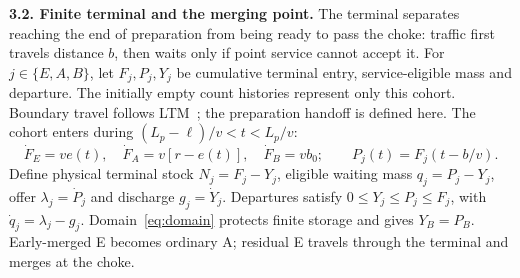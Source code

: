 \documentclass[10pt,a4paper]{article}
\begin{document}
\textbf{3.2. Finite terminal and the merging point.}
The terminal separates reaching the end of preparation from being
ready to pass the choke: traffic first travels distance $b$, then waits
only if point service cannot accept it.
For $j\in\{E,A,B\}$, let $F_j,P_j,Y_j$ be cumulative terminal entry,
service-eligible mass and departure.
The initially empty count histories represent only this cohort.
Boundary travel follows LTM~\cite{jin}; the preparation handoff is defined
here. The cohort enters during $(L_p-\ell)/v<t<L_p/v$:
\begin{equation}
 \dot F_E=ve(t),\quad \dot F_A=v[r-e(t)],\quad \dot F_B=vb_0;
 \qquad P_j(t)=F_j(t-b/v).
 \label{eq:arrivals}
\end{equation}
Define physical terminal stock $N_j=F_j-Y_j$, eligible waiting mass
$q_j=P_j-Y_j$, offer $\lambda_j=\dot P_j$ and discharge $g_j=\dot Y_j$.
Departures satisfy $0\leq Y_j\leq P_j\leq F_j$, with
$\dot q_j=\lambda_j-g_j$. Domain~\eqref{eq:domain} protects finite storage
and gives $Y_B=P_B$. Early-merged E becomes ordinary A; residual E travels
through the terminal and merges at the choke.
\end{document}
